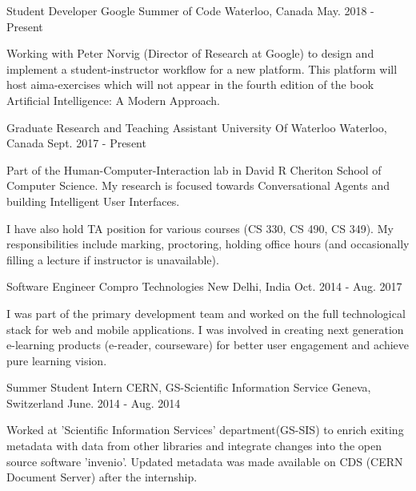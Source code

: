 \begin{cventries}
  \cventry
	{Student Developer} %
	{Google Summer of Code} %
	{Waterloo, Canada} %
	{May. 2018 - Present} %
    {
      \begin{cvitems}
        \item {Working with Peter Norvig (Director of Research at Google) to design and implement a student-instructor workflow for a new platform. This platform will host aima-exercises which will not appear in the fourth edition of the book Artificial Intelligence: A Modern Approach.}
      \end{cvitems}
    }
  \cventry
	{Graduate Research and Teaching Assistant} %
	{University Of Waterloo} %
	{Waterloo, Canada} %
	{Sept. 2017 - Present} %
    {
      \begin{cvitems}
        \item {Part of the Human-Computer-Interaction lab in David R Cheriton School of Computer Science. My research is focused towards Conversational Agents and building Intelligent User Interfaces.}
        \item {I have also hold TA position for various courses (CS 330, CS 490, CS 349). My responsibilities include marking, proctoring, holding office hours (and occasionally filling a lecture if instructor is unavailable).}
      \end{cvitems}
    }
  \cventry
    {Software Engineer} %
    {Compro Technologies} %
    {New Delhi, India} %
    {Oct. 2014 - Aug. 2017} %
    {
      \begin{cvitems}
        \item {I was part of the primary development team and worked on the full technological stack for web and mobile applications. I was involved in creating next generation e-learning products (e-reader, courseware) for better user engagement and achieve pure learning vision.}
      \end{cvitems} 
    }
  \cventry
    {Summer Student Intern} %
    {CERN, GS-Scientific Information Service} %
    {Geneva, Switzerland} %
    {June. 2014 - Aug. 2014} %
    {
      \begin{cvitems}
        \item {Worked at 'Scientific Information Services' department(GS-SIS) to enrich exiting metadata with data from other libraries and integrate changes into the open source software 'invenio'. Updated metadata was made available on CDS (CERN Document Server) after the internship.}

\end{cvitems}}
\end{cventries}
